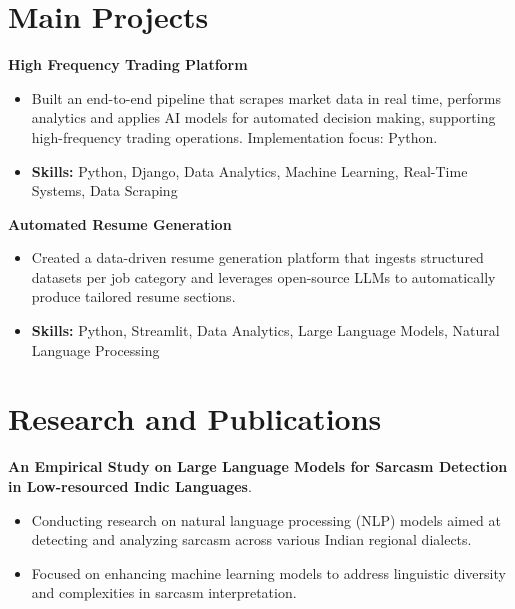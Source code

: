\documentclass[a4paper,11pt]{article}
\begin{document}
\section{\textbf{Main Projects}}

\vspace{1mm}
  \textbf{High Frequency Trading Platform  }
\vspace{-1.5mm} %
\begin{itemize}
  \item Built an end-to-end pipeline that scrapes market data in real time, performs analytics and applies AI models for automated decision making, supporting high-frequency trading operations. Implementation focus: Python.
\vspace{-3mm}
  \item \textbf{Skills:} Python, Django, Data Analytics, Machine Learning, Real-Time Systems, Data Scraping
\end{itemize}


\vspace{1mm}
   \textbf{Automated Resume Generation }
\vspace{-1.5mm} %
\begin{itemize}
  \item Created a data-driven resume generation platform that ingests structured datasets per job category and leverages open-source LLMs to automatically produce tailored resume sections.
\vspace{-3mm}
  \item \textbf{Skills:} Python, Streamlit, Data Analytics, Large Language Models, Natural Language Processing
\end{itemize}



\section{\textbf{Research and Publications} \hfill }
\vspace{1mm}
  \textbf{An Empirical Study on Large Language Models for Sarcasm Detection in Low-resourced Indic Languages}.
\vspace{-1mm} %
\begin{itemize}
  \item Conducting research on natural language processing (NLP) models aimed at detecting and analyzing sarcasm across various Indian regional dialects.
\vspace{-3mm}
  \item Focused on enhancing machine learning models to address linguistic diversity and complexities in sarcasm interpretation.
\end{itemize}
\end{document}
